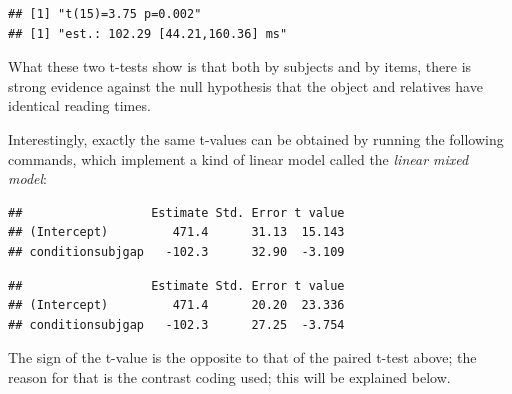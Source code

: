 \documentclass[
  12pt,
]{krantz}
\newenvironment{Shaded}{\begin{snugshade}}{\end{snugshade}}
\newcommand{\DecValTok}[1]{\textcolor[rgb]{0.00,0.00,0.81}{#1}}
\newcommand{\FunctionTok}[1]{\textcolor[rgb]{0.00,0.00,0.00}{#1}}
\newcommand{\NormalTok}[1]{#1}
\newcommand{\OtherTok}[1]{\textcolor[rgb]{0.56,0.35,0.01}{#1}}
\newcommand{\SpecialCharTok}[1]{\textcolor[rgb]{0.00,0.00,0.00}{#1}}
\theoremstyle{definition}
\theoremstyle{definition}
\theoremstyle{definition}
\theoremstyle{definition}
\theoremstyle{remark}
\begin{document}
\begin{verbatim}
## [1] "t(15)=3.75 p=0.002"
## [1] "est.: 102.29 [44.21,160.36] ms"
\end{verbatim}

What these two t-tests show is that both by subjects and by items, there is strong evidence against the null hypothesis that the object and relatives have identical reading times.

Interestingly, exactly the same t-values can be obtained by running the following commands, which implement a kind of linear model called the \emph{linear mixed model}:

\begin{Shaded}
\end{Shaded}

\begin{verbatim}
##                  Estimate Std. Error t value
## (Intercept)         471.4      31.13  15.143
## conditionsubjgap   -102.3      32.90  -3.109
\end{verbatim}

\begin{Shaded}
\end{Shaded}

\begin{verbatim}
##                  Estimate Std. Error t value
## (Intercept)         471.4      20.20  23.336
## conditionsubjgap   -102.3      27.25  -3.754
\end{verbatim}

The sign of the t-value is the opposite to that of the paired t-test above; the reason for that is the contrast coding used; this will be explained below.
\end{document}
